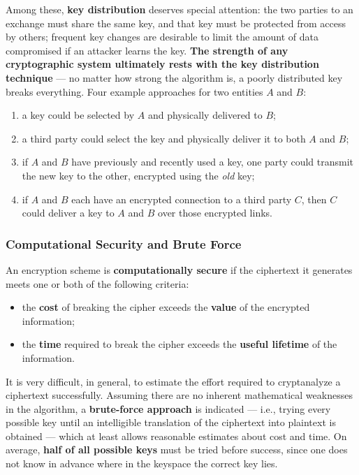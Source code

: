 \documentclass[12pt, a4paper]{article}
\begin{document}
Among these, \textbf{key distribution} deserves special attention: the two parties to an exchange must share the same key, and that key must be protected from access by others; frequent key changes are desirable to limit the amount of data compromised if an attacker learns the key. \textcolor{red!70!black}{\textbf{The strength of any cryptographic system ultimately rests with the key distribution technique}} — no matter how strong the algorithm is, a poorly distributed key breaks everything. Four example approaches for two entities $A$ and $B$:
\begin{enumerate}
    \item a key could be selected by $A$ and physically delivered to $B$;
    \item a third party could select the key and physically deliver it to both $A$ and $B$;
    \item if $A$ and $B$ have previously and recently used a key, one party could transmit the new key to the other, encrypted using the \emph{old} key;
    \item if $A$ and $B$ each have an encrypted connection to a third party $C$, then $C$ could deliver a key to $A$ and $B$ over those encrypted links.
\end{enumerate}

\subsubsection{Computational Security and Brute Force}
An encryption scheme is \textbf{computationally secure} if the ciphertext it generates meets one or both of the following criteria:
\begin{itemize}
    \item the \textbf{cost} of breaking the cipher exceeds the \textbf{value} of the encrypted information;
    \item the \textbf{time} required to break the cipher exceeds the \textbf{useful lifetime} of the information.
\end{itemize}
It is very difficult, in general, to estimate the effort required to cryptanalyze a ciphertext successfully. Assuming there are no inherent mathematical weaknesses in the algorithm, a \textbf{brute-force approach} is indicated — i.e., trying every possible key until an intelligible translation of the ciphertext into plaintext is obtained — which at least allows reasonable estimates about cost and time. On average, \textbf{half of all possible keys} must be tried before success, since one does not know in advance where in the keyspace the correct key lies.
\end{document}
